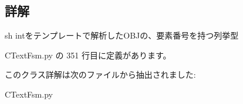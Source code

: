 \subsection{詳解}
\begin{DoxyVerb}sh intをテンプレートで解析したOBJの、要素番号を持つ列挙型
\end{DoxyVerb}
 

 C\+Text\+Fsm.\+py の 351 行目に定義があります。



このクラス詳解は次のファイルから抽出されました\+:\begin{DoxyCompactItemize}
\item 
C\+Text\+Fsm.\+py\end{DoxyCompactItemize}
